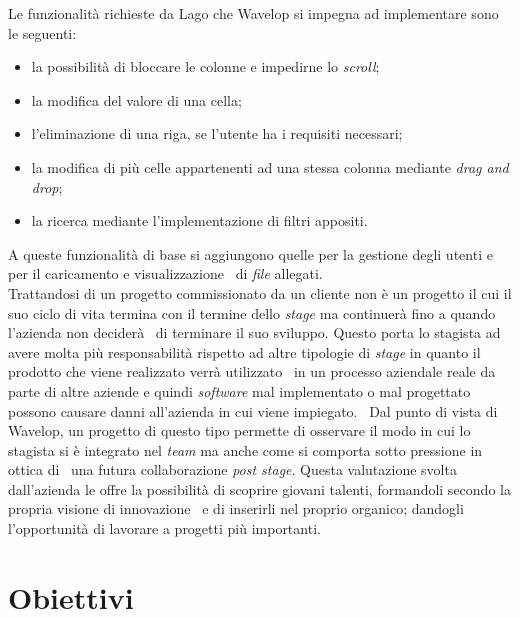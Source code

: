 Le funzionalità richieste da Lago che Wavelop si impegna ad implementare sono le seguenti: \
\begin{itemize}
  \item la possibilità di bloccare le colonne e impedirne lo \emph{scroll};
  \item la modifica del valore di una cella;
  \item l'eliminazione di una riga, se l'utente ha i requisiti necessari;
  \item la modifica di più celle appartenenti ad una stessa colonna mediante \emph{drag and drop};
  \item la ricerca mediante l'implementazione di filtri appositi.
\end{itemize}
A queste funzionalità di base si aggiungono quelle per la gestione degli utenti e per il caricamento e visualizzazione \
di \emph{file} allegati. \\

Trattandosi di un progetto commissionato da un cliente non è un progetto il cui il suo ciclo di vita termina con il termine dello \emph{stage} ma continuerà fino a quando l'azienda non deciderà \
di terminare il suo sviluppo. Questo porta lo stagista ad avere molta più responsabilità rispetto ad altre tipologie di \emph{stage} in quanto il prodotto che viene realizzato verrà utilizzato \
in un processo aziendale reale da parte di altre aziende e quindi \emph{software} mal implementato o mal progettato possono causare danni all'azienda in cui viene impiegato. \
Dal punto di vista di Wavelop, un progetto di questo tipo permette di osservare il modo in cui lo stagista si è integrato nel \emph{team} ma anche come si comporta sotto pressione in ottica di \
una futura collaborazione \emph{post stage}. Questa valutazione svolta dall'azienda le offre la possibilità di scoprire giovani talenti, formandoli secondo la propria visione di innovazione \
e di inserirli nel proprio organico; dandogli l'opportunità di lavorare a progetti più importanti. 

\section{Obiettivi}

